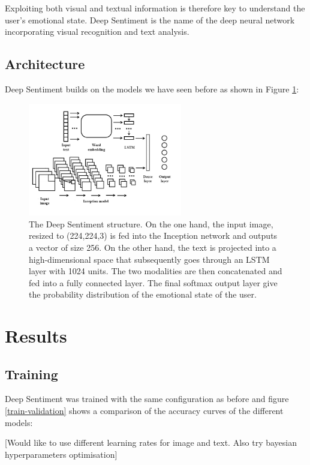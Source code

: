 \documentclass{article} %
\begin{document}
Exploiting both visual and textual information is therefore key to understand the user's emotional state. Deep Sentiment is the name of the deep neural network incorporating visual recognition and text analysis.

\subsection{Architecture}
Deep Sentiment builds on the models we have seen before as shown in Figure \ref{deep-sentiment}:

\begin{figure}[H]
    \centering
    \includegraphics[width=0.6\textwidth]{Images/deep-sentiment-structure.jpg}
    \caption{The Deep Sentiment structure. On the one hand, the input image, resized to (224,224,3) is fed into the Inception network and outputs a vector of size 256. On the other hand, the text is projected into a high-dimensional space that subsequently goes through an LSTM layer with 1024 units. The two modalities are then concatenated and fed into a fully connected layer. The final softmax output layer give the probability distribution of the emotional state of the user.}
    \label{deep-sentiment}
\end{figure}

\section{Results}

\subsection{Training}
Deep Sentiment was trained with the same configuration as before and figure \ref{train-validation} shows a comparison of the accuracy curves of the different models:

[Would like to use different learning rates for image and text. Also try bayesian hyperparameters optimisation]
\end{document}
